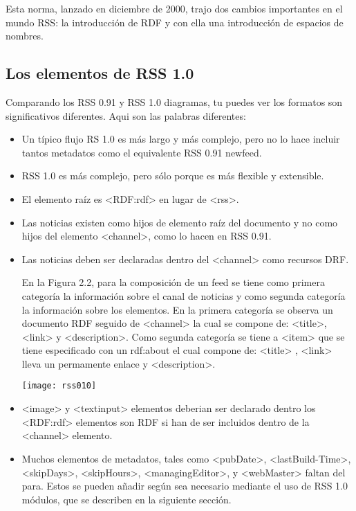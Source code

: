 Esta norma, lanzado en diciembre de 2000, trajo dos cambios importantes en el mundo RSS: la introducci\'{o}n
de RDF y con ella una introducci\'{o}n de espacios de nombres.\cite{hammersley2005developing}
 
\subsection{Los elementos de RSS 1.0}

Comparando los RSS 0.91 y RSS 1.0 diagramas, tu puedes ver los formatos son significativos diferentes.
Aqui son las palabras diferentes:

\begin{itemize}

\item Un típico flujo RS 1.0 es más largo y más complejo, pero no lo hace incluir tantos metadatos como el
equivalente RSS 0.91 newfeed.

\item RSS 1.0 es más complejo, pero sólo porque es más flexible y extensible.

\item El elemento raíz es <RDF:rdf> en lugar de <rss>.

\item Las noticias existen como hijos de elemento raíz del documento y no como hijos del elemento <channel>,
como lo hacen en RSS 0.91.

\item Las noticias deben ser declaradas dentro del <channel> como recursos DRF. \par

En la Figura 2.2, para la composici\'{o}n de un feed se tiene como primera categor\'{i}a la informaci\'{o}n sobre el 
canal de noticias y como segunda categor\'{i}a la informaci\'{o}n sobre los elementos. En la primera  categor\'{i}a
se observa un documento RDF seguido de <channel> la cual se compone de: <title>, <link> y <description>. Como segunda
categor\'{i}a se tiene a <item> que se tiene especificado con un rdf:about el cual compone de: <title> , <link> lleva
un permamente enlace y <description>. 

\begin{minipage}{1.0\linewidth}
	\centering
	\texttt{[image: rss010]}
\end{minipage}

\item <image> y <textinput> elementos deberian ser declarado dentro los <RDF:rdf> elementos son RDF
si han de ser incluidos dentro de la <channel> elemento.

\item Muchos elementos de metadatos, tales como  <pubDate>, <lastBuild-Time>, <skipDays>,
<skipHours>, <managingEditor>, y <webMaster> faltan del para. Estos se pueden añadir según sea necesario
mediante el uso de RSS 1.0 módulos, que se describen en la siguiente sección.\cite{johnson2006rss}

\end{itemize}

